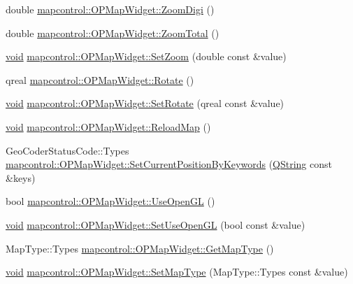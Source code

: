 \begin{DoxyCompactItemize}
\item 
double \hyperlink{group___o_p_map_widget_gaf7a725070972e7158ec0f5b10a0d9cd3}{mapcontrol\-::\-O\-P\-Map\-Widget\-::\-Zoom\-Digi} ()
\item 
double \hyperlink{group___o_p_map_widget_ga2060cbfea71913a458f3a6f0c6dad8c5}{mapcontrol\-::\-O\-P\-Map\-Widget\-::\-Zoom\-Total} ()
\item 
\hyperlink{group___u_a_v_objects_plugin_ga444cf2ff3f0ecbe028adce838d373f5c}{void} \hyperlink{group___o_p_map_widget_ga63fe346f4ea58f09453ccd42ffe87260}{mapcontrol\-::\-O\-P\-Map\-Widget\-::\-Set\-Zoom} (double const \&value)
\item 
qreal \hyperlink{group___o_p_map_widget_gaea05eeafa50a244b2356918c2dae0444}{mapcontrol\-::\-O\-P\-Map\-Widget\-::\-Rotate} ()
\item 
\hyperlink{group___u_a_v_objects_plugin_ga444cf2ff3f0ecbe028adce838d373f5c}{void} \hyperlink{group___o_p_map_widget_ga1e6312bc140cbcfa38ac1bd66b278a71}{mapcontrol\-::\-O\-P\-Map\-Widget\-::\-Set\-Rotate} (qreal const \&value)
\item 
\hyperlink{group___u_a_v_objects_plugin_ga444cf2ff3f0ecbe028adce838d373f5c}{void} \hyperlink{group___o_p_map_widget_ga5281e4aae5ac664f9d4093735e6ced51}{mapcontrol\-::\-O\-P\-Map\-Widget\-::\-Reload\-Map} ()
\item 
\-Geo\-Coder\-Status\-Code\-::\-Types \hyperlink{group___o_p_map_widget_ga6dfd41d966be5940e4bb94dd36a25499}{mapcontrol\-::\-O\-P\-Map\-Widget\-::\-Set\-Current\-Position\-By\-Keywords} (\hyperlink{group___u_a_v_objects_plugin_gab9d252f49c333c94a72f97ce3105a32d}{\-Q\-String} const \&keys)
\item 
bool \hyperlink{group___o_p_map_widget_gafe684fbd6e3d76b2dbb9eeb2ffeab969}{mapcontrol\-::\-O\-P\-Map\-Widget\-::\-Use\-Open\-G\-L} ()
\item 
\hyperlink{group___u_a_v_objects_plugin_ga444cf2ff3f0ecbe028adce838d373f5c}{void} \hyperlink{group___o_p_map_widget_ga1dad00a9a3dc508690c7db4cb7b3373d}{mapcontrol\-::\-O\-P\-Map\-Widget\-::\-Set\-Use\-Open\-G\-L} (bool const \&value)
\item 
\-Map\-Type\-::\-Types \hyperlink{group___o_p_map_widget_gaf5f079175bace819bcc168c5ea4bdb59}{mapcontrol\-::\-O\-P\-Map\-Widget\-::\-Get\-Map\-Type} ()
\item 
\hyperlink{group___u_a_v_objects_plugin_ga444cf2ff3f0ecbe028adce838d373f5c}{void} \hyperlink{group___o_p_map_widget_ga57d623773f3801edb2a359b9d92c648b}{mapcontrol\-::\-O\-P\-Map\-Widget\-::\-Set\-Map\-Type} (\-Map\-Type\-::\-Types const \&value)

\end{DoxyCompactItemize}
